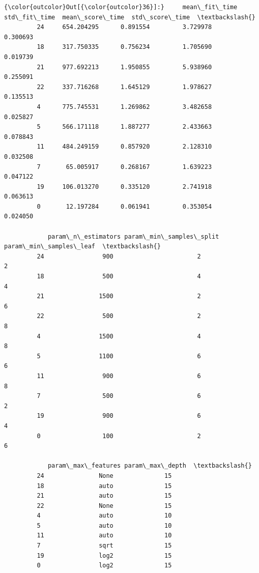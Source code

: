 \documentclass[11pt]{article}
\begin{document}
\begin{Verbatim}[commandchars=\\\{\}]
{\color{outcolor}Out[{\color{outcolor}36}]:}     mean\_fit\_time  std\_fit\_time  mean\_score\_time  std\_score\_time  \textbackslash{}
         24     654.204295      0.891554         3.729978        0.300693   
         18     317.750335      0.756234         1.705690        0.019739   
         21     977.692213      1.950855         5.938960        0.255091   
         22     337.716268      1.645129         1.978627        0.135513   
         4      775.745531      1.269862         3.482658        0.025827   
         5      566.171118      1.887277         2.433663        0.078843   
         11     484.249159      0.857920         2.128310        0.032508   
         7       65.005917      0.268167         1.639223        0.047122   
         19     106.013270      0.335120         2.741918        0.063613   
         0       12.197284      0.061941         0.353054        0.024050   
         
            param\_n\_estimators param\_min\_samples\_split param\_min\_samples\_leaf  \textbackslash{}
         24                900                       2                      2   
         18                500                       4                      4   
         21               1500                       2                      6   
         22                500                       2                      8   
         4                1500                       4                      8   
         5                1100                       6                      6   
         11                900                       6                      8   
         7                 500                       6                      2   
         19                900                       6                      4   
         0                 100                       2                      6   
         
            param\_max\_features param\_max\_depth  \textbackslash{}
         24               None              15   
         18               auto              15   
         21               auto              15   
         22               None              15   
         4                auto              10   
         5                auto              10   
         11               auto              10   
         7                sqrt              15   
         19               log2              15   
         0                log2              15   
         

\end{Verbatim}
\end{document}
